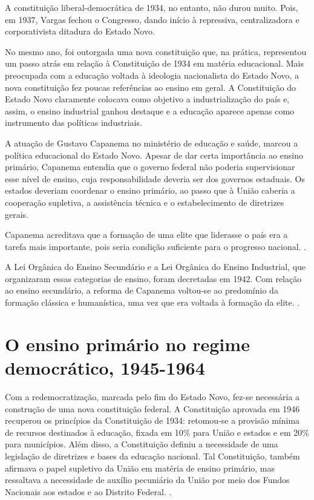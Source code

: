 \documentclass[a4paper,12pt]{article}
\begin{document}
A constituição liberal-democrática de 1934, no entanto, não durou muito. Pois, em 1937,
Vargas fechou o Congresso, dando início à repressiva, centralizadora e corporativista ditadura do Estado Novo.

No mesmo ano, foi outorgada uma nova constituição que,
na prática, representou um passo atrás em relação à Constituição de 1934 em matéria educacional.
Mais preocupada com a educação voltada à ideologia nacionalista do Estado Novo, a nova constituição fez poucas referências ao ensino em geral.
A Constituição do Estado Novo claramente colocava como objetivo a industrialização do país e, assim, o ensino industrial ganhou destaque e a educação aparece apenas como instrumento das políticas industriais.
\cite{kang}

A atuação de Gustavo Capanema no ministério de educação e saúde, marcou a política educacional do Estado Novo.
Apesar de dar certa importância ao ensino primário, Capanema entendia que o governo federal não poderia supervisionar esse nível de ensino,
cuja responsabilidade deveria ser dos governos estaduais.
Os estados deveriam coordenar o ensino primário, ao passo que à União caberia a cooperação supletiva, a assistência técnica e o estabelecimento de diretrizes gerais. \cite{Quadros_Machado_2013}

Capanema acreditava que a formação de uma elite que liderasse o país era a tarefa mais importante, pois seria condição suficiente para o progresso nacional. \cite{capanema}.

\begin{citacao}
A Lei Orgânica do Ensino Secundário e a Lei Orgânica do Ensino Industrial, que organizaram essas categorias de ensino, foram decretadas em 1942. Com relação ao ensino secundário, a reforma de Capanema voltou-se ao predomínio da formação clássica e humanística, uma vez que era voltada à formação da elite. \cite[p. 40]{kang}.
\end{citacao}

\section*{O ensino primário no regime democrático, 1945-1964}

Com a redemocratização, marcada pelo fim do Estado Novo, fez-se necessária a construção de uma nova constituição federal.
A Constituição aprovada em 1946 recuperou os princípios da Constituição de 1934: retomou-se a provisão mínima de recursos destinados à educação, fixada em 10\% para União e estados e em 20\% para municípios.
Além disso, a Constituição definiu a necessidade de uma legislação de diretrizes e bases da educação nacional.
Tal Constituição, também afirmava o papel supletivo da União em matéria de ensino primário,
mas ressaltava a necessidade de auxílio pecuniário da União por meio dos Fundos Nacionais aos estados e ao Distrito Federal.
\cite{kang}.
\end{document}
